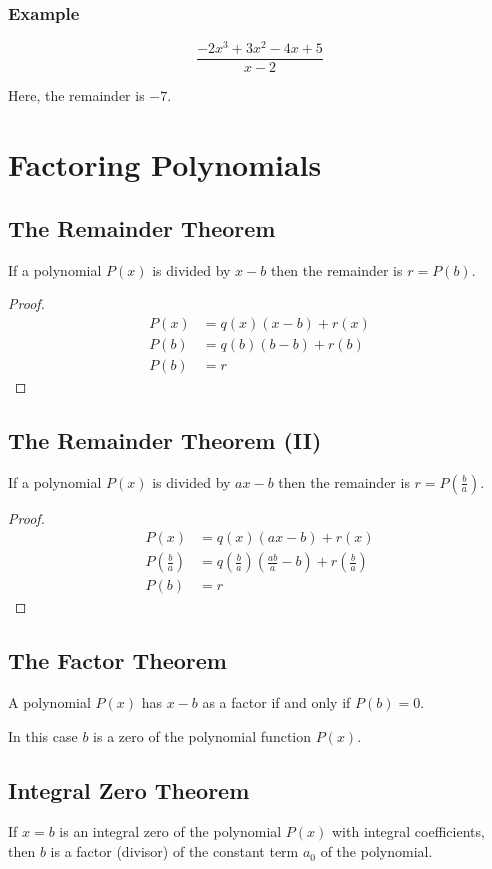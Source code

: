 			\subsubsection{Example}
				\[\frac{-2x^3+3x^2-4x+5}{x-2}\]
				\vspace{\baselineskip}
				\begin{center}
				\end{center}
				Here, the remainder is $-7$.
	\section{Factoring Polynomials}
		\subsection{The Remainder Theorem}
			If a polynomial $P(x)$ is divided by $x-b$ then the remainder is $r=P(b)$.
			\begin{proof}
				\begin{align*}
					P(x) &= q(x)(x-b)+r(x)\\
					P(b) &= q(b)(b-b)+r(b)\\
					P(b) &= r
				\end{align*}
			\end{proof}
		\subsection{The Remainder Theorem (II)}
			If a polynomial $P(x)$ is divided by $ax-b$ then the remainder is $r=P\left(\frac{b}{a}\right)$.
			\begin{proof}
				\begin{align*}
					P(x) &= q(x)(ax-b)+r(x)\\
					P\left(\frac{b}{a}\right) &= q\left(\frac{b}{a}\right)\left(\frac{ab}{a}-b\right)+r\left(\frac{b}{a}\right)\\
					P(b) &= r
				\end{align*}
			\end{proof}
		\subsection{The Factor Theorem}
			A polynomial $P(x)$ has $x-b$ as a factor if and only if $P(b)=0$.

			In this case $b$ is a zero of the polynomial function $P(x)$.
		\subsection{Integral Zero Theorem}
			If $x=b$ is an integral zero of the polynomial $P(x)$ with integral coefficients, then $b$ is a factor (divisor) of the constant term $a_0$ of the polynomial.
